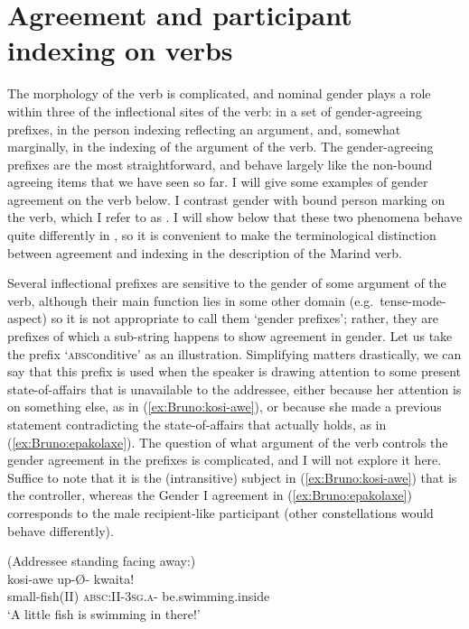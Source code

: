 \documentclass[output=collectionpaper]{langsci/langscibook}
\begin{document}
\section{Agreement and participant indexing on verbs}\label{sec:Bruno:Mar-indexing}

The morphology of the  verb is complicated, and nominal gender plays a role within three of the inflectional sites of the verb: in a set of gender-agreeing prefixes, in the person indexing reflecting an  argument, and, somewhat marginally, in the indexing of the  argument of the verb. The gender-agreeing prefixes are the most straightforward, and behave largely like the non-bound agreeing items that we have seen so far. I will give some examples of gender agreement on the verb below. I contrast gender  with bound person marking on the verb, which I refer to as . I will show below that these two phenomena behave quite differently in , so it is convenient to make the terminological distinction between agreement and indexing in the description of the Marind verb.

Several inflectional prefixes are sensitive to the gender of some argument of the verb, although their main function lies in some other domain (e.g.\ tense-mode-aspect) so it is not appropriate to call them `gender prefixes'; rather, they are prefixes of which a sub-string happens to show agreement in gender. Let us take the prefix  `\textsc{absc}onditive' as an illustration. Simplifying matters drastically, we can say that this prefix is used when the speaker is drawing attention to some present state-of-affairs that is unavailable to the addressee, either because her attention is on something else, as in (\ref{ex:Bruno:kosi-awe}), or because she made a previous statement contradicting the state-of-affairs that actually holds, as in (\ref{ex:Bruno:epakolaxe}). The question of what argument of the verb controls the gender agreement in the prefixes is complicated, and I will not explore it here. Suffice to note that it is the (intransitive) subject in (\ref{ex:Bruno:kosi-awe}) that is the controller, whereas the Gender I agreement in (\ref{ex:Bruno:epakolaxe}) corresponds to the male recipient-like participant (other constellations would behave differently).

\ea
\label{ex:Bruno:kosi-awe}
(Addressee standing facing away:)\\
\gll kosi-awe up-\O- kwa\GH ita! \\
small-fish(II) \textsc{absc}:II-3\textsc{sg}.\textsc{a}- be.swimming.inside\\
\glt `A little fish is swimming in there!'
\z
\end{document}
